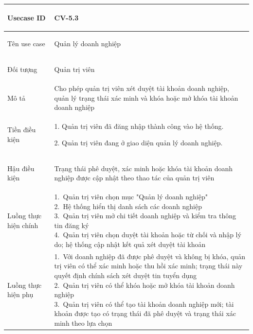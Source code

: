 \begin{table}[H]
    \centering
    \small
    \renewcommand{\arraystretch}{1.0}
    \begin{tabularx}{\textwidth}{|
        >{\bfseries\raggedright\arraybackslash}p{3.2cm}|Y|}
        \hline

        Usecase ID & CV-5.3 \\ \hline

        Tên use case & Quản lý doanh nghiệp \\ \hline

        Đối tượng & Quản trị viên \\ \hline

        Mô tả & Cho phép quản trị viên xét duyệt tài khoản doanh nghiệp, quản lý trạng thái xác minh và khóa hoặc mở khóa tài khoản doanh nghiệp \\ \hline

        Tiền điều kiện &
        \parbox[t]{\hsize}{
            1. Quản trị viên đã đăng nhập thành công vào hệ thống.\par
            2. Quản trị viên đang ở giao diện quản lý doanh nghiệp.
        } \\
        \hline

        Hậu điều kiện & Trạng thái phê duyệt, xác minh hoặc khóa tài khoản doanh nghiệp được cập nhật theo thao tác của quản trị viên \\ \hline

        Luồng thực hiện chính &
        \parbox[t]{\hsize}{
            1.\ Quản trị viên chọn mục "Quản lý doanh nghiệp"\\
            2.\ Hệ thống hiển thị danh sách các doanh nghiệp\\
            3.\ Quản trị viên mở chi tiết doanh nghiệp và kiểm tra thông tin đăng ký\\
            4.\ Quản trị viên chọn duyệt tài khoản hoặc từ chối và nhập lý do; hệ thống cập nhật kết quả xét duyệt tài khoản
        }\\
        \hline

        Luồng thực hiện phụ &
        \parbox[t]{\hsize}{
            1.\ Với doanh nghiệp đã được phê duyệt và không bị khóa, quản trị viên có thể xác minh hoặc thu hồi xác minh; trạng thái này quyết định chính sách xét duyệt tin tuyển dụng\\
            2.\ Quản trị viên có thể khóa hoặc mở khóa tài khoản doanh nghiệp\\
            3.\ Quản trị viên có thể tạo tài khoản doanh nghiệp mới; tài khoản được tạo có trạng thái đã phê duyệt và trạng thái xác minh theo lựa chọn
        }\\
        \hline


\end{tabularx}
\end{table}
